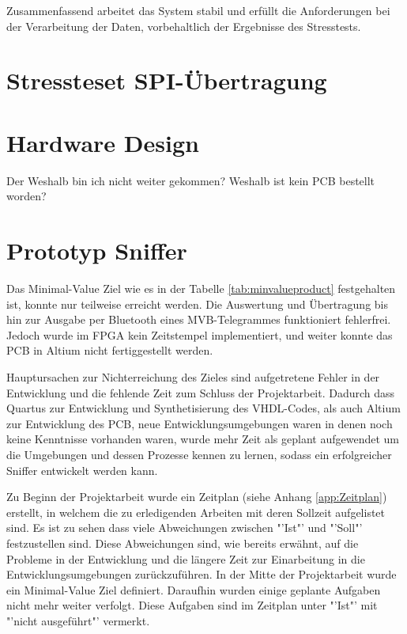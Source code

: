 Zusammenfassend arbeitet das System stabil und erfüllt die Anforderungen bei der Verarbeitung der Daten, vorbehaltlich der Ergebnisse des Stresstests.

\section{Stressteset SPI-Übertragung}

\section{Hardware Design}
\label{sec:DiskussionHardware}

Der
Weshalb bin ich nicht weiter gekommen? Weshalb ist kein PCB bestellt worden?

\section{Prototyp Sniffer}
\label{sec:DiskussionSniffer}
Das Minimal-Value Ziel wie es in der Tabelle \ref{tab:minvalueproduct} festgehalten ist, konnte nur teilweise erreicht werden. Die Auswertung und Übertragung bis hin zur Ausgabe per Bluetooth eines MVB-Telegrammes funktioniert fehlerfrei. Jedoch wurde im FPGA kein Zeitstempel implementiert, und weiter konnte das PCB in Altium nicht fertiggestellt werden.

Hauptursachen zur Nichterreichung des Zieles sind aufgetretene Fehler in der Entwicklung und die fehlende Zeit zum Schluss der Projektarbeit. Dadurch dass Quartus zur Entwicklung und Synthetisierung des VHDL-Codes, als auch Altium zur Entwicklung des PCB, neue Entwicklungsumgebungen waren in denen noch keine Kenntnisse vorhanden waren, wurde mehr Zeit als geplant aufgewendet um die Umgebungen und dessen Prozesse kennen zu lernen, sodass ein erfolgreicher Sniffer entwickelt werden kann.

Zu Beginn der Projektarbeit wurde ein Zeitplan (siehe Anhang \ref{app:Zeitplan}) erstellt, in welchem die zu erledigenden Arbeiten mit deren Sollzeit aufgelistet sind. Es ist zu sehen dass viele Abweichungen zwischen "'Ist"' und "'Soll"' festzustellen sind. Diese Abweichungen sind, wie bereits erwähnt, auf die Probleme in der Entwicklung und die längere Zeit zur Einarbeitung in die Entwicklungsumgebungen zurückzuführen. In der Mitte der Projektarbeit wurde ein Minimal-Value Ziel definiert. Daraufhin wurden einige geplante Aufgaben nicht mehr weiter verfolgt. Diese Aufgaben sind im Zeitplan unter "'Ist"' mit "'nicht ausgeführt"' vermerkt.
